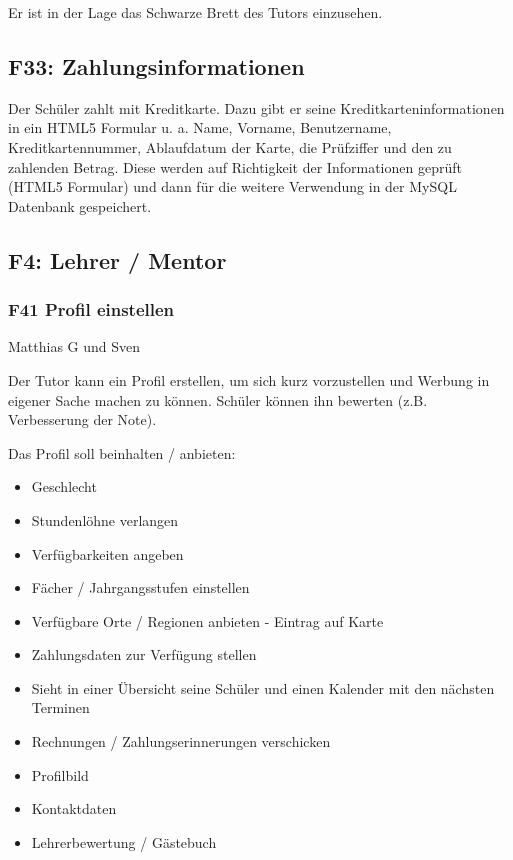 \documentclass[10pt,a4paper]{scrartcl}
\begin{document}
Er ist in der Lage das Schwarze Brett des Tutors einzusehen.

\subsection*{F33: Zahlungsinformationen}

Der Schüler zahlt mit Kreditkarte. Dazu gibt er seine Kreditkarteninformationen in ein HTML5 Formular u. a. Name, Vorname, Benutzername, Kreditkartennummer, Ablaufdatum der Karte, die Prüfziffer und den zu zahlenden Betrag. Diese werden auf Richtigkeit der Informationen geprüft (HTML5 Formular) und dann für die weitere Verwendung in der MySQL Datenbank gespeichert. 

\subsection{F4: Lehrer / Mentor}
\subsubsection*{F41 Profil einstellen}

Matthias G und Sven

Der Tutor kann ein Profil erstellen, um sich kurz vorzustellen und Werbung in eigener Sache machen zu können. Schüler können ihn bewerten (z.B. Verbesserung der Note).

Das Profil soll beinhalten / anbieten:
\begin{itemize}
	\item Geschlecht
	\item Stundenlöhne verlangen
	\item Verfügbarkeiten angeben
	\item Fächer / Jahrgangsstufen einstellen
	\item Verfügbare Orte / Regionen anbieten - Eintrag auf Karte
	\item Zahlungsdaten zur Verfügung stellen
	\item Sieht in einer Übersicht seine Schüler und einen Kalender mit den nächsten Terminen
	\item Rechnungen / Zahlungserinnerungen verschicken
	\item Profilbild
	\item Kontaktdaten
	\item Lehrerbewertung / Gästebuch
\end{itemize}
\end{document}
